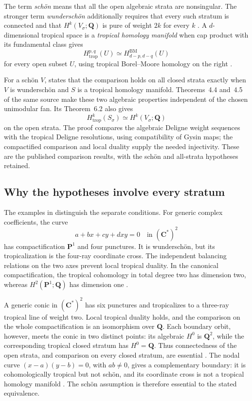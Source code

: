 The term \emph{sch\"on} means that all the open algebraic strata are
nonsingular. The stronger term \emph{wundersch\"on} additionally requires
that every such stratum is connected and that $H^k(V_\sigma;\mathbf Q)$
is pure of weight $2k$ for every $k$
\cite[Definition~1.2 and \S2.2]{AAPS25Cohomologically}.
A $d$-dimensional tropical space is a \emph{tropical homology manifold}
when cap product with its fundamental class gives
\[
 H^{p,q}_{\mathrm{trop}}(U)
       \simeq H^{\mathrm{BM}}_{d-p,d-q}(U)
\]
for every open subset $U$, using tropical Borel--Moore homology on the
right \cite[Definition~2.6]{AAPS25Cohomologically}.

For a sch\"on $V$, \cite[Theorem~6.1]{AAPS25Cohomologically} states
that the comparison holds on all closed strata exactly when $V$ is
wundersch\"on and $S$ is a tropical homology manifold. Theorems~4.4
and~4.5 of the same source make these two algebraic properties independent
of the chosen unimodular fan. Its Theorem~6.2 also gives
\[
 H^k_{\mathrm{trop}}(S_\sigma)
       \simeq H^k(V_\sigma;\mathbf Q)
\]
on the open strata. The proof compares the algebraic Deligne weight
sequences with the tropical Deligne resolutions, using compatibility of
Gysin maps; the compactified comparison and local duality supply the
needed injectivity. These are the published comparison results, with the
sch\"on and all-strata hypotheses retained.

\subsection{Why the hypotheses involve every stratum}

The examples in \cite[\S8.1]{AAPS25Cohomologically} distinguish the
separate conditions. For generic complex coefficients, the curve
\[
                 a+bx+cy+dxy=0\quad\text{in }(\mathbf C^*)^2
\]
has compactification $\mathbf P^1$ and four punctures. It is
wundersch\"on, but its tropicalization is the four-ray coordinate cross.
The independent balancing relations on the two axes prevent local
tropical duality. In the canonical compactification, the tropical
cohomology in total degree two has dimension two, whereas
$H^2(\mathbf P^1;\mathbf Q)$ has dimension one
\cite[\S8.1.1]{AAPS25Cohomologically}.

A generic conic in $(\mathbf C^*)^2$ has six punctures and tropicalizes
to a three-ray tropical line of weight two. Local tropical duality holds,
and the comparison on the whole compactification is an isomorphism over
$\mathbf Q$. Each boundary orbit, however, meets the conic in two
distinct points: its algebraic $H^0$ is $\mathbf Q^2$, while the
corresponding tropical closed stratum has $H^0=\mathbf Q$. Thus
connectedness of the open strata, and comparison on every closed stratum,
are essential \cite[\S8.1.2]{AAPS25Cohomologically}.
The nodal curve $(x-a)(y-b)=0$, with $ab\ne0$, gives a complementary
boundary: it is cohomologically tropical but not sch\"on, and its
coordinate cross is not a tropical homology manifold
\cite[\S8.1.4]{AAPS25Cohomologically}. The sch\"on assumption is
therefore essential to the stated equivalence.

